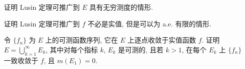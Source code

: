 \documentclass[../../main.tex]{subfiles}
\begin{document}
\begin{exercise}\label{exercise:ch03-29}
证明 Lusin 定理可推广到 $E$ 具有无穷测度的情形.
\end{exercise}

\begin{exercise}\label{exercise:ch03-30}
证明 Lusin 定理可推广到 $f$ 不必是实值, 但是可以为 a.e. 有限的情形.
\end{exercise}

\begin{exercise}\label{exercise:ch03-31}
令 $\{f_{n}\}$ 为 $E$ 上的可测函数序列, 它在 $E$ 上逐点收敛于实值函数 $f$. 证明 $E=\bigcup_{k=1}^{\infty}E_{k}$, 其中对每个指标 $k$, $E_{k}$ 是可测的, 且若 $k>1$, 在每个 $E_{k}$ 上 $\{f_{n}\}$ 一致收敛于 $f$, 且 $m(E_{1})=0$.
\end{exercise}
\end{document}
